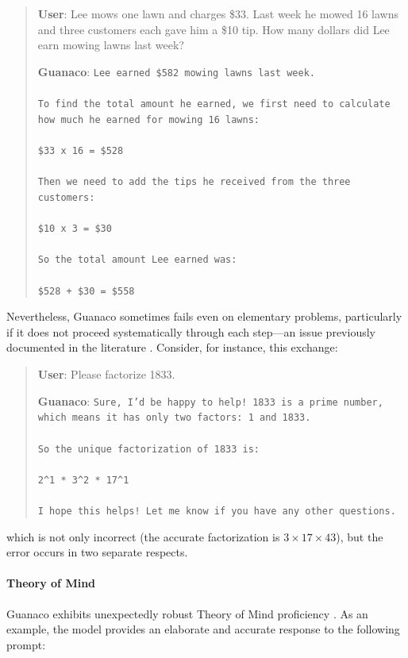 \begin{quote}
    \textbf{User}: Lee mows one lawn and charges \$33. Last week he mowed 16 lawns and three customers each gave him a \$10 tip. How many dollars did Lee earn mowing lawns last week?

    \textbf{Guanaco}: \texttt{Lee earned \$582 mowing lawns last week. \\ \\ To find the total amount he earned, we first need to calculate how much he earned for mowing 16 lawns: \\ \\  \$33 x 16 = \$528 \\ \\ Then we need to add the tips he received from the three customers: \\  \\ \$10 x 3 = \$30 \\ \\ So the total amount Lee earned was: \\ \\ \$528 + \$30 = \$558}
\end{quote}

Nevertheless, {Guanaco} sometimes fails even on elementary problems, particularly if it does not proceed systematically through each step—an issue previously documented in the literature \cite{weichain}. Consider, for instance, this exchange:

\begin{quote}
    \textbf{User}: Please factorize 1833.

    \textbf{Guanaco}: \texttt{Sure, I'd be happy to help! 1833 is a prime number, which means it has only two factors: 1 and 1833. \\ \\ So the unique factorization of 1833 is: \\ \\ 2\^{}1 * 3\^{}2 * 17\^{}1 \\ \\ I hope this helps! Let me know if you have any other questions.}
\end{quote}

which is not only incorrect (the accurate factorization is $3 \times 17 \times 43$), but the error occurs in two separate respects.

\paragraph{Theory of Mind} {Guanaco} exhibits unexpectedly robust Theory of Mind proficiency \cite{nematzadeh2018evaluating, sap2022neural}. As an example, the model provides an elaborate and accurate response to the following prompt:


